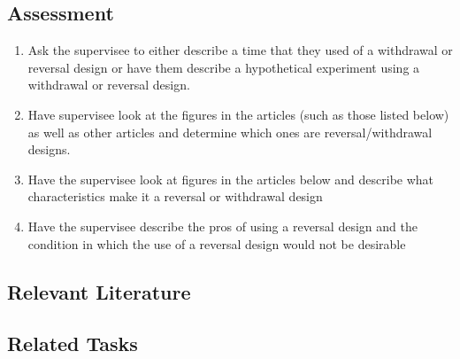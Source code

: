 \subsection{Assessment}
\begin{enumerate}
\item  Ask the supervisee to either describe a time that they used of a withdrawal or reversal design or have them describe a hypothetical experiment using a withdrawal or reversal design. 
\item Have supervisee look at the figures in the articles (such as those listed below) as well as other articles and determine which ones are reversal/withdrawal designs. 
\item Have the supervisee look at figures in the articles below and describe what characteristics make it a reversal or withdrawal design
\item Have the supervisee describe the pros of using a reversal design and the condition in which the use of a reversal design would not be desirable
\end{enumerate}
%
\subsection{Relevant Literature}
\begin{refsection}
\nocite{test,alang2017police,clayton2018black}
\printbibliography[heading=none]
\end{refsection}
%
\subsection{Related Tasks} 
\fourbThree{}\\ 
\fourjNine{}\\
%

